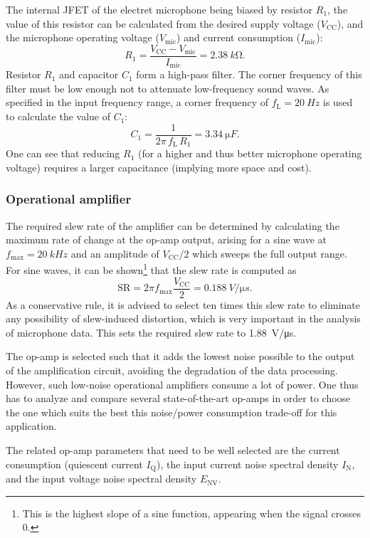 \documentclass{EPL-master-thesis-covers-EN}
\newcommand{\te}[1]{\textrm{#1}}
\begin{document}
The internal JFET of the electret microphone being biased by resistor $R_1$, the value of this resistor can be calculated from the desired supply voltage ($V_\te{CC}$), and the microphone operating voltage ($V_\te{mic}$) and current consumption ($I_\te{mic}$):
\[
 R_1 = \frac{V_\te{CC} - V_\te{mic}}{I_\te{mic}} = \SI{2.38}{k\ohm}.
\]
Resistor $R_1$ and capacitor $C_1$ form a high-pass filter. The corner frequency of this filter must be low enough not to attenuate low-frequency sound waves. As specified in the input frequency range, a corner frequency of $f_\te{L} = \SI{20}{Hz}$ is used to calculate the value of $C_1$:
\[
 C_1 = \frac{1}{2 \pi \, f_\te{L} \, R_1} = \SI{3.34}{\micro F}.
\]
One can see that reducing $R_1$ (for a higher and thus better microphone operating voltage) requires a larger capacitance (implying more space and cost).

\subsubsection*{Operational amplifier}

The required slew rate of the amplifier can be determined by calculating the maximum rate of change at the op-amp output, arising  for a sine wave at $f_\te{max} = \SI{20}{kHz}$ and an amplitude of $V_\te{CC}/2$ which sweeps the full output range. For sine waves, it can be shown\footnote{This is the highest slope of a sine function, appearing when the signal crosses 0.} that the slew rate is computed as
\[
 \te{SR} = 2 \pi f_\te{max} \frac{V_\te{CC}}{2} = \SI{0.188}{V/\micro s}.
\]
As a conservative rule, it is advised to select ten times this slew rate to eliminate any possibility of slew-induced distortion, which is very important in the analysis of microphone data. This sets the required slew rate to \SI{1.88}{V/\micro s}.

The op-amp is selected such that it adds the lowest noise possible to the output of the amplification circuit, avoiding the degradation of the data processing. However, such low-noise operational amplifiers consume a lot of power. One thus has to analyze and compare several state-of-the-art op-amps in order to choose the one which suits the best this noise/power consumption trade-off for this application.

The related op-amp parameters that need to be well selected are the current consumption (quiescent current $I_\te{Q}$), the input current noise spectral density $I_\te{N}$, and the input voltage noise spectral density $E_\te{NV}$.
\end{document}
